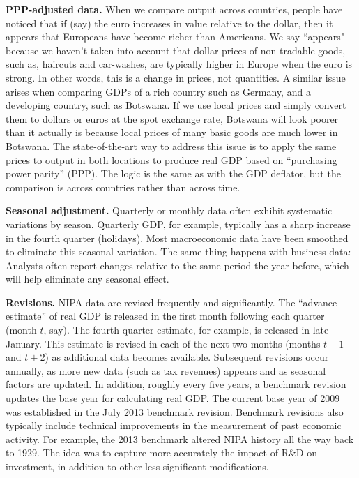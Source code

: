 \textbf{PPP-adjusted data.} When we compare output across countries, people have noticed that
if (say) the euro increases in value relative to the dollar, then
it appears that Europeans have become richer than Americans. We
say ``appears" because we haven't taken into account that dollar
prices of non-tradable goods, such as, haircuts and car-washes, are
typically higher in Europe when the euro is strong. In other
words, this is a change in prices, not quantities. A similar issue
arises when comparing GDPs of a rich country such as Germany, and a
developing country, such as Botswana. If we use local prices and
simply convert them to dollars or euros at the spot exchange rate,
Botswana will look poorer than it actually is because local
prices of many basic goods are much lower in Botswana. The
state-of-the-art way to address this issue is to apply the same
prices to output in both locations to produce real GDP based on ``purchasing power
parity'' (PPP). The logic is the same as with the
GDP deflator, but the comparison is across countries rather
than across time.


\textbf{Seasonal adjustment.} Quarterly or monthly data often exhibit systematic variations by season.
Quarterly GDP, for example, typically has a sharp increase in the fourth quarter
(holidays).
Most macroeconomic data have been smoothed to eliminate this seasonal variation.
The same thing happens with business data: Analysts often report changes relative to the same period the year before,
which will help eliminate any seasonal effect.

\textbf{Revisions.} 
NIPA data are revised frequently and significantly. The ``advance estimate''
of real GDP  is released in the first month following each quarter (month $t$, say). 
The fourth quarter estimate, for example, is released in late January.  
This estimate is revised in each of the next two months (months $t+1$ and $t+2$) 
as additional data becomes available. 
Subsequent revisions occur annually, as more new data (such as tax revenues) appears 
and as seasonal factors are updated. In addition, roughly every five years,
a benchmark revision updates the base year for calculating real GDP. The current 
base year of 2009 was established in the July 2013 benchmark revision. Benchmark 
revisions also typically include technical improvements in the measurement of 
past economic activity. For example, the 2013 benchmark altered NIPA history 
all the way back to 1929.
The idea was to capture more accurately the impact of R\&D on investment, 
in addition to other less significant modifications. 


